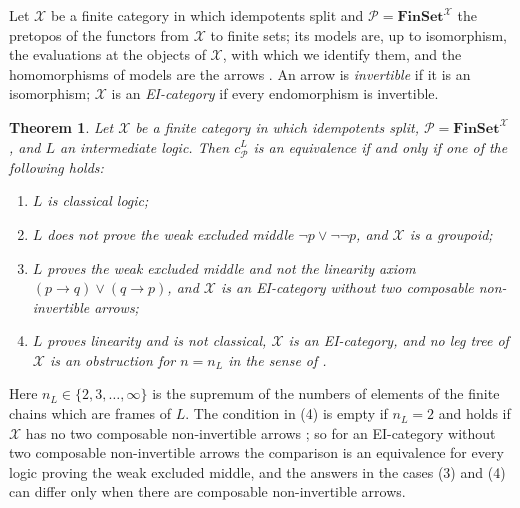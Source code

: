 \documentclass[11pt]{amsart}
\newtheorem{thm}{Theorem}[section]
\theoremstyle{definition}
\newcommand{\Fin}{\mathbf{FinSet}}
\newcommand{\cX}{\mathcal X}
\newcommand{\cP}{\mathcal P}
\begin{document}
Let $\cX$ be a finite category in which idempotents split and
$\cP=\Fin^{\cX}$ the pretopos of the functors from $\cX$ to finite
sets; its models are, up to isomorphism, the evaluations at the
objects of $\cX$, with which we identify them, and the homomorphisms
of models are the arrows \cite[\S7]{Heyting}. An arrow is
\emph{invertible} if it is an isomorphism; $\cX$ is an
\emph{EI-category} if every endomorphism is invertible.

\begin{thm}\label{thm:class}
Let $\cX$ be a finite category in which idempotents split, $\cP=
\Fin^{\cX}$, and $L$ an intermediate logic. Then $c^L_\cP$ is an
equivalence if and only if one of the following holds:
\begin{enumerate}
\item[(1)] $L$ is classical logic;
\item[(2)] $L$ does not prove the weak excluded middle $\neg p\vee\neg
\neg p$, and $\cX$ is a groupoid;
\item[(3)] $L$ proves the weak excluded middle and not the linearity
axiom $(p\to q)\vee(q\to p)$, and $\cX$ is an EI-category without two
composable non-invertible arrows;
\item[(4)] $L$ proves linearity and is not classical, $\cX$ is an
EI-category, and no leg tree of $\cX$ is an obstruction for $n=n_L$ in
the sense of \cite[Thm.~6.15]{Strings}.
\end{enumerate}
\end{thm}

Here $n_L\in\{2,3,\dots,\infty\}$ is the supremum of the numbers of
elements of the finite chains which are frames of $L$. The condition in (4) is empty
if $n_L=2$ and holds if $\cX$ has no two composable non-invertible
arrows \cite[Cor.~6.3]{Strings}; so for an EI-category without two
composable non-invertible arrows the comparison is an equivalence for
every logic proving the weak excluded middle, and the answers in the
cases (3) and (4) can differ only when there are composable
non-invertible arrows.
\end{document}
